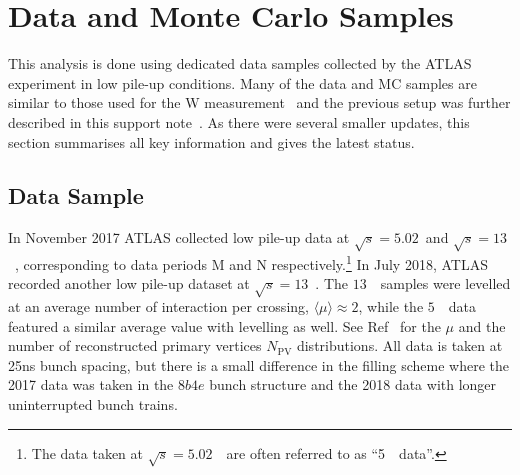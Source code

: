 
\chapter{Data and Monte Carlo Samples}
\label{sec:samples}

This analysis is done using dedicated data samples collected by the ATLAS experiment in low pile-up conditions. Many of the data and MC samples are similar to those used for the W \pT measurement~\cite{STDM-2018-17} and the previous setup was further described in this support note~\cite{Kretzschmar:2657141}. As there were several smaller updates, this section summarises all key information and gives the latest status. 

\section{Data Sample}

In November 2017 ATLAS collected low pile-up data at
$\sqrt{s} = 5.02$~\TeV and $\sqrt{s} = 13$~\TeV, corresponding to data
periods M and N respectively.\footnote{The data taken at
  $\sqrt{s} = 5.02$~\TeV\ are often referred to as ``5~\TeV\ data''.}
In July 2018, ATLAS recorded another low pile-up dataset at
$\sqrt{s} = 13$~\TeV. The $13$~\TeV\ samples were levelled at an average
number of interaction per crossing, $\langle\mu\rangle \approx 2$,
while the $5$~\TeV\ data featured a similar average value with
levelling as well. See Ref~\cite{Kretzschmar:2657141} for the $\mu$
and the number of reconstructed primary vertices $N_\mathrm{PV}$
distributions. All data is taken at 25ns bunch spacing, but there is a
small difference in the filling scheme where the 2017 data was taken
in the $8b4e$ bunch structure and the 2018 data with longer
uninterrupted bunch trains.


